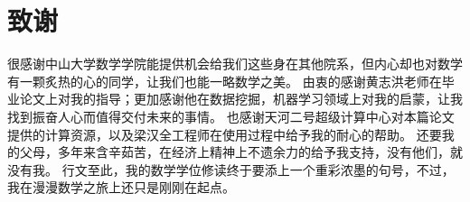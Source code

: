 \documentclass[UTF8,11pt,a4paper,nofonts]{ctexart}
\begin{document}
\section{致谢}

很感谢中山大学数学学院能提供机会给我们这些身在其他院系，但内心却也对数学有一颗炙热的心的同学，让我们也能一略数学之美。
由衷的感谢黄志洪老师在毕业论文上对我的指导；更加感谢他在数据挖掘，机器学习领域上对我的启蒙，让我找到振奋人心而值得交付未来的事情。
也感谢天河二号超级计算中心对本篇论文提供的计算资源，以及梁汉全工程师在使用过程中给予我的耐心的帮助。
还要我的父母，多年来含辛茹苦，在经济上精神上不遗余力的给予我支持，没有他们，就没有我。
行文至此，我的数学学位修读终于要添上一个重彩浓墨的句号，不过，我在漫漫数学之旅上还只是刚刚在起点。


\newpage
{}

\end{document}
